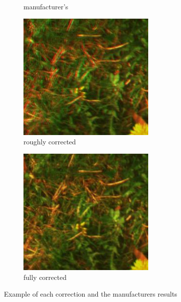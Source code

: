 \documentclass[../thesis.tex]{subfiles}
\begin{document}
\begin{figure}[ht]
\begin{subfigure}[b]{0.23\textwidth}
			\caption{manufacturer's}
			\label{fig:merged-correction-manufacturer}
		\end{subfigure}
		\begin{subfigure}[b]{0.23\textwidth}
			\centering
			\includegraphics[width=\linewidth]{img/registration/results-affine}
			\caption{roughly corrected}
			\label{fig:merged-correction-affine}
		\end{subfigure}
		\begin{subfigure}[b]{0.23\textwidth}
			\centering
			\includegraphics[width=\linewidth]{img/registration/results-perspective}
			\caption{fully corrected}
			\label{fig:merged-correction-perspective}
		\end{subfigure}
	
		\caption{Example of each correction and the manufacturers results}
		\label{fig:merged-correction}
	\end{figure}
	
\end{document}
